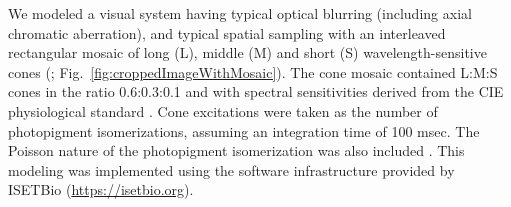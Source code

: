 \documentclass{jov}
\begin{document}
We modeled a visual system having typical optical blurring (including axial chromatic aberration)\cite{marimont1994matching}, and typical spatial sampling with an interleaved rectangular mosaic of long (L), middle (M)  and short (S) wavelength-sensitive cones (; Fig.~\ref{fig:croppedImageWithMosaic}). 
The cone mosaic contained L:M:S cones in the ratio 0.6:0.3:0.1 and with spectral sensitivities derived from the CIE physiological standard \cite{CIE86}.
Cone excitations were taken as the number of photopigment isomerizations, assuming an integration time of 100 msec. 
The Poisson nature of the photopigment isomerization was also included \cite{hecht1942energy}. 
This modeling was implemented using the software infrastructure provided by ISETBio (\href{https://isetbio.org}{https://isetbio.org}).
\end{document}
